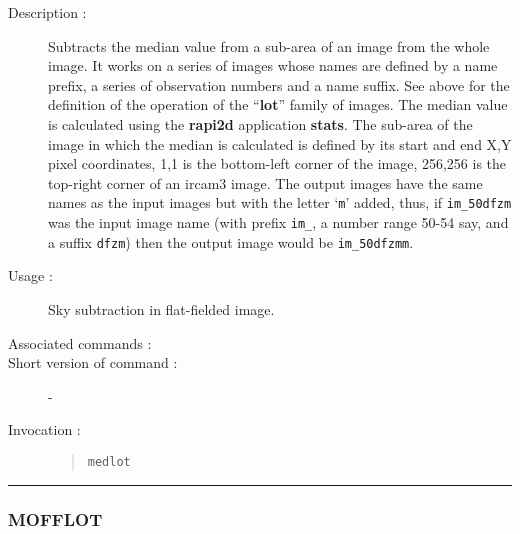 \begin{description}

\item[Description :] Subtracts the median value from a
sub-area of an image from the whole image.  It works on a series of
images whose names are defined by a name prefix, a series of
observation numbers and a name suffix. See above for the definition of
the operation of the ``{\bf lot}'' family of images.  The median value
is calculated using the {\bf rapi2d} application {\bf stats}.  The
sub-area of the image in which the median is calculated is defined by
its start and end X,Y pixel coordinates, 1,1 is the bottom-left corner
of the image, 256,256 is the top-right corner of an {\sc ircam3}
image.  The output images have the same names as the input images but
with the letter `{\tt m}' added, thus, if {\tt im\_50dfzm} was the
input image name (with prefix {\tt im\_}, a number range 50-54 say, and
a suffix {\tt dfzm}) then the output image would be {\tt im\_50dfzmm}.

\item[Usage :] Sky subtraction in flat-fielded image.
\item[Associated commands :] {\tt {}}
\item[Short version of command :] -
\item[Invocation :]

\begin{quote}{\tt  medlot }\end{quote}

\end{description}

\hrule 
\subsubsection*{\label{MOFFLOT}MOFFLOT}

